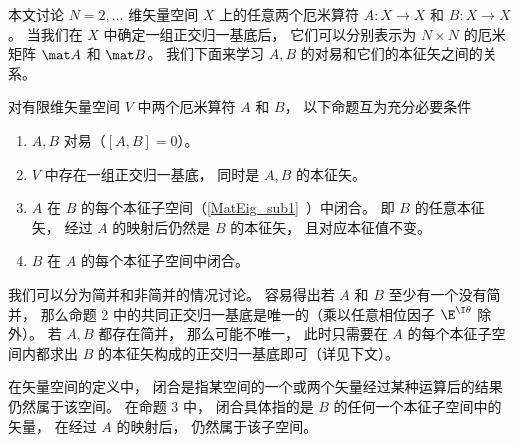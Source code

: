 

本文讨论 $N = 2, \dots$ 维矢量空间 $X$ 上的任意两个厄米算符 $A: X \to X$ 和 $B: X \to X$。 当我们在 $X$ 中确定一组正交归一基底后， 它们可以分别表示为 $N \times N$ 的厄米矩阵 $\mat A$ 和 $\mat B$。 我们下面来学习 $A, B$ 的对易和它们的本征矢之间的关系。

\begin{theorem}{}\label{Commut_the1}
对有限维矢量空间 $V$ 中两个厄米算符 $A$ 和 $B$， 以下命题互为充分必要条件
\begin{enumerate}
\item $A,B$ 对易（$[A,B] = 0$）。
\item $V$ 中存在一组正交归一基底， 同时是 $A, B$ 的本征矢。
\item $A$ 在 $B$ 的每个本征子空间（\autoref{MatEig_sub1}~）中闭合。 即 $B$ 的任意本征矢， 经过 $A$ 的映射后仍然是 $B$ 的本征矢， 且对应本征值不变。
\item $B$ 在 $A$ 的每个本征子空间中闭合。
\end{enumerate}
\end{theorem}

我们可以分为简并和非简并的情况讨论。 容易得出若 $A$ 和 $B$ 至少有一个没有简并， 那么命题 2 中的共同正交归一基底是唯一的（乘以任意相位因子 $\E^{\I\theta}$ 除外）。 若 $A,B$ 都存在简并， 那么可能不唯一， 此时只需要在 $A$ 的每个本征子空间内都求出 $B$ 的本征矢构成的正交归一基底即可（详见下文）。

在矢量空间的定义中， 闭合是指某空间的一个或两个矢量经过某种运算后的结果仍然属于该空间。 在命题 3 中， 闭合具体指的是 $B$ 的任何一个本征子空间中的矢量， 在经过 $A$ 的映射后， 仍然属于该子空间。

